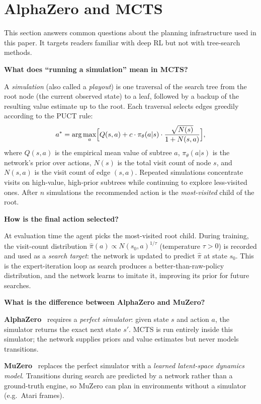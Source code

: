 \appendix

\section{AlphaZero and MCTS}
\label{app:az_primer}

This section answers common questions about the planning infrastructure used in this
paper. It targets readers familiar with deep RL but not with tree-search methods.

\textbf{What does ``running a simulation'' mean in MCTS?}

A \emph{simulation} (also called a \emph{playout}) is one traversal of the search tree
from the root node (the current observed state) to a leaf, followed by a backup of
the resulting value estimate up to the root.
Each traversal selects edges greedily according to the PUCT rule:
\[
  a^* = \arg\max_a \Bigl[Q(s,a)
        + c \cdot \pi_\theta(a|s)
          \cdot \frac{\sqrt{N(s)}}{1+N(s,a)}\Bigr],
\]
where $Q(s,a)$ is the empirical mean value of subtree $a$,
$\pi_\theta(a|s)$ is the network's prior over actions,
$N(s)$ is the total visit count of node $s$,
and $N(s,a)$ is the visit count of edge $(s,a)$.
Repeated simulations concentrate visits on high-value, high-prior subtrees while
continuing to explore less-visited ones.
After $n$ simulations the recommended action is the \emph{most-visited} child of
the root.

\textbf{How is the final action selected?}

At evaluation time the agent picks the most-visited root child.
During training, the visit-count distribution
$\hat{\pi}(a) \propto N(s_0,a)^{1/\tau}$
(temperature $\tau > 0$) is recorded and used as a \emph{search target}:
the network is updated to predict $\hat{\pi}$ at state $s_0$.
This is the expert-iteration loop as search produces a better-than-raw-policy
distribution, and the network learns to imitate it, improving its prior for
future searches.


\textbf{What is the difference between AlphaZero and MuZero?}

\textbf{AlphaZero}~\cite{silver2018general} requires a \emph{perfect simulator}:
given state $s$ and action $a$, the simulator returns the exact next state $s'$.
MCTS is run entirely inside this simulator; the network supplies priors and value
estimates but never models transitions.

\textbf{MuZero}~\cite{schrittwieser2020muzero} replaces the perfect simulator with a
\emph{learned latent-space dynamics model}.
Transitions during search are predicted by a network rather than a ground-truth
engine, so MuZero can plan in environments without a simulator (e.g.\ Atari frames).

